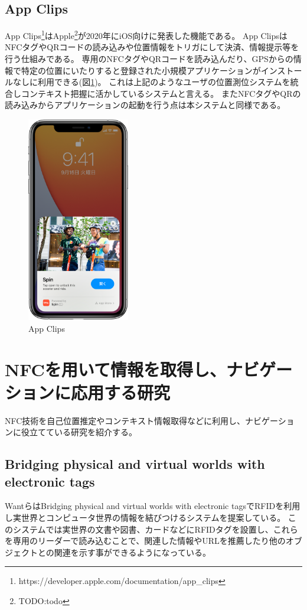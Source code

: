 \subsection{App Clips}
App Clips\footnote{\textsf{https://developer.apple.com/documentation/app\_clips}}はApple\footnote{\textsf{TODO:todo}}が2020年にiOS向けに発表した機能である。
App ClipsはNFCタグやQRコードの読み込みや位置情報をトリガにして決済、情報提示等を行う仕組みである。
専用のNFCタグやQRコードを読み込んだり、GPSからの情報で特定の位置にいたりすると登録された小規模アプリケーションがインストールなしに利用できる(図\ref{fig:appClips})。
これは上記のようなユーザの位置測位システムを統合しコンテキスト把握に活かしているシステムと言える。
またNFCタグやQRの読み込みからアプリケーションの起動を行う点は本システムと同様である。

\begin{figure}[h]
  \centering 
  \includegraphics[height=90mm]{images/appClips.png}
  \caption{App Clips} \label{fig:appClips}
\end{figure}

\section{NFCを用いて情報を取得し、ナビゲーションに応用する研究}
NFC技術を自己位置推定やコンテキスト情報取得などに利用し、ナビゲーションに役立てている研究を紹介する。

\subsection{Bridging physical and virtual worlds with electronic tags}
WantらはBridging physical and virtual worlds with electronic tags\cite{10.1145/302979.303111}でRFIDを利用し実世界とコンピュータ世界の情報を結びつけるシステムを提案している。
このシステムでは実世界の文書や図書、カードなどにRFIDタグを設置し、これらを専用のリーダーで読み込むことで、関連した情報やURLを推薦したり他のオブジェクトとの関連を示す事ができるようになっている。

